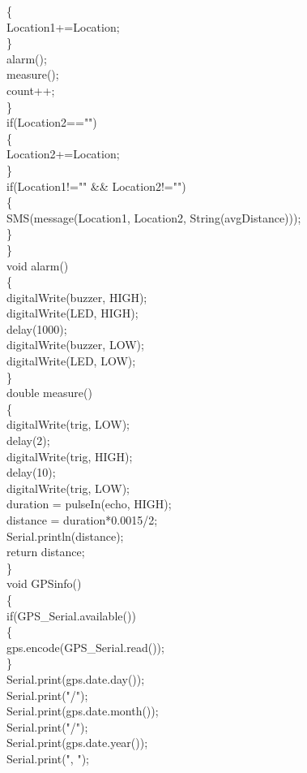 \documentclass[12pt, top = 1 inch, bottom = 1 inch, left = 1.2 inch, top = .8 inch]{book}
\begin{document}
			\{\\
				Location1+=Location;\\
			\}\\
			alarm();\\
			measure();\\
			count++;\\
		\}\\
		if(Location2=="")\\
		\{\\
			Location2+=Location;\\
		\}\\
		if(Location1!="" \&\& Location2!="")\\
		\{\\
			SMS(message(Location1, Location2, String(avgDistance)));\\
		\}\\
	\}\\
	void alarm()\\
	\{\\
		digitalWrite(buzzer, HIGH);\\
		digitalWrite(LED, HIGH);\\
		delay(1000);\\
		digitalWrite(buzzer, LOW);\\
		digitalWrite(LED, LOW);\\
	\}\\
	double measure()\\
	\{\\
		digitalWrite(trig, LOW);\\
		delay(2);\\
		digitalWrite(trig, HIGH);\\
		delay(10);\\
		digitalWrite(trig, LOW);\\
		duration = pulseIn(echo, HIGH);\\
		distance = duration*0.0015/2;\\
		Serial.println(distance);\\
		return distance;\\
	\}\\
	void GPSinfo()\\
	\{\\
		if(GPS\_Serial.available())\\
		\{\\
			gps.encode(GPS\_Serial.read());\\ 
		\}\\
		
		Serial.print(gps.date.day());\\
		Serial.print("/");\\
		Serial.print(gps.date.month());\\
		Serial.print("/");\\
		Serial.print(gps.date.year());\\
		Serial.print(", ");\\
		
\end{document}
